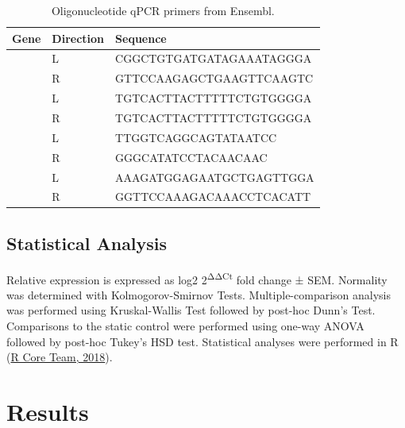 \documentclass[
  12pt,
]{article}
\begin{document}
\begin{table}[!h]

\caption{\label{tab:primers}Oligonucleotide qPCR primers from Ensembl.}
\begin{tabu} to 
\toprule
Gene & Direction & Sequence\\
\midrule
 & L & CGGCTGTGATGATAGAAATAGGGA\\

 & R & GTTCCAAGAGCTGAAGTTCAAGTC\\

 & L & TGTCACTTACTTTTTCTGTGGGGA\\

 & R & TGTCACTTACTTTTTCTGTGGGGA\\

 & L & TTGGTCAGGCAGTATAATCC\\

 & R & GGGCATATCCTACAACAAC\\

 & L & AAAGATGGAGAATGCTGAGTTGGA\\

 & R & GGTTCCAAAGACAAACCTCACATT\\
\bottomrule
\end{tabu}
\end{table}

\hypertarget{statistical-analysis}{%
\subsection{Statistical Analysis}\label{statistical-analysis}}

Relative expression is expressed as log2 2\textsuperscript{ΔΔCt} fold change ± SEM. Normality was determined with Kolmogorov-Smirnov Tests. Multiple-comparison analysis was performed using Kruskal-Wallis Test followed by post-hoc Dunn's Test. Comparisons to the static control were performed using one-way ANOVA followed by post-hoc Tukey's HSD test. Statistical analyses were performed in R (\protect\hyperlink{ref-R}{R Core Team, 2018}).

\hypertarget{results}{%
\section{Results}\label{results}}
\end{document}
